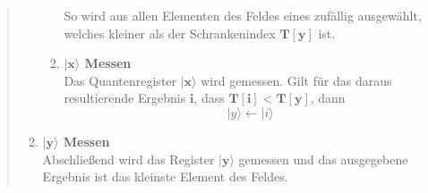 \begin{quote}
\begin{enumerate}
\begin{enumerate}
            So wird aus allen Elementen des Feldes eines zufällig ausgewählt, welches kleiner als der Schrankenindex $\mathbf{T[y]}$ ist.
            \item \textbf{$\mathbf{|x\rangle}$ Messen}
            \\
            Das Quantenregister $\mathbf{|x\rangle}$ wird gemessen. 
            Gilt für das daraus resultierende Ergebnis $\mathbf{i}$, dass $\mathbf{T[i] < T[y]}$, dann 
            \begin{equation}
                |y\rangle \leftarrow |i\rangle
            \end{equation}
        \end{enumerate}

        \item \textbf{$\mathbf{|y\rangle}$ Messen}
        \\
        Abschließend wird das Register $\mathbf{|y\rangle}$ gemessen und das ausgegebene Ergebnis ist das kleinste Element des Feldes.
    \end{enumerate}
\end{quote}

